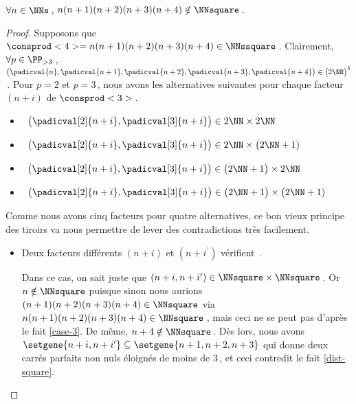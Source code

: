 \begin{fact}
	 $\forall n \in \NNs$\,, $n(n+1)(n+2)(n+3)(n+4) \notin \NNsquare$\,.
\end{fact}




\begin{proof}
    Supposons que $\consprod<4> = n(n+1)(n+2)(n+3)(n+4) \in \NNssquare$\,.
    Clairement, $\forall p \in \PP_{>3}$\,, 
    $\big( \padicval{n} , \padicval{n + 1} , \padicval{n + 2} , \padicval{n + 3} , \padicval{n + 4} \big) \in \big( 2 \NN \big)^5$\,.
    Pour $p = 2$ et $p = 3$\,, nous avons les alternatives suivantes pour chaque facteur $(n+i)$ de $\consprod<3>$\,.
    \begin{itemize}
    	\item {}\,
		$\big( \padicval[2]{n + i} , \padicval[3]{n + i} \big) \in 2 \NN \times 2 \NN$

    	\item {}\,
		$\big( \padicval[2]{n + i} , \padicval[3]{n + i} \big) \in 2 \NN \times \big( 2 \NN + 1)$

    	\item {}\,
		$\big( \padicval[2]{n + i} , \padicval[3]{n + i} \big) \in \big( 2 \NN + 1 \big) \times 2 \NN$

    	\item {}\,
		$\big( \padicval[2]{n + i} , \padicval[3]{n + i} \big) \in \big( 2 \NN + 1 \big) \times \big( 2 \NN + 1)$
    \end{itemize}
    
    \medskip
    
    Comme nous avons cinq facteurs pour quatre alternatives, ce bon vieux principe des tiroirs va nous permettre de lever des contradictions très facilement.
    \begin{itemize}
    	\item Deux facteurs différents $(n+i)$ et $(n+i^\prime)$ vérifient \,.
		
		\smallskip
		\noindent
		Dans ce cas, on sait juste que $(n+i, n+i^\prime) \in \NNsquare \times \NNsquare$\,.
		Or $n \notin \NNsquare$ puisque sinon nous aurions $(n+1)(n+2)(n+3)(n+4) \in \NNsquare$ via $n(n+1)(n+2)(n+3)(n+4) \in \NNsquare$\,, mais ceci ne se peut pas d'après le fait \ref{case-3}.
		De même, $n+4 \notin \NNsquare$\,.
		Dès lors, nous avons $\setgene{n+i, n+i^\prime} \subseteq \setgene{n+1, n+2, n+3}$ qui donne deux carrés parfaits non nuls éloignés de moins de $3$\,, et ceci contredit le fait \ref{dist-square}.



\end{itemize}
\end{proof}

